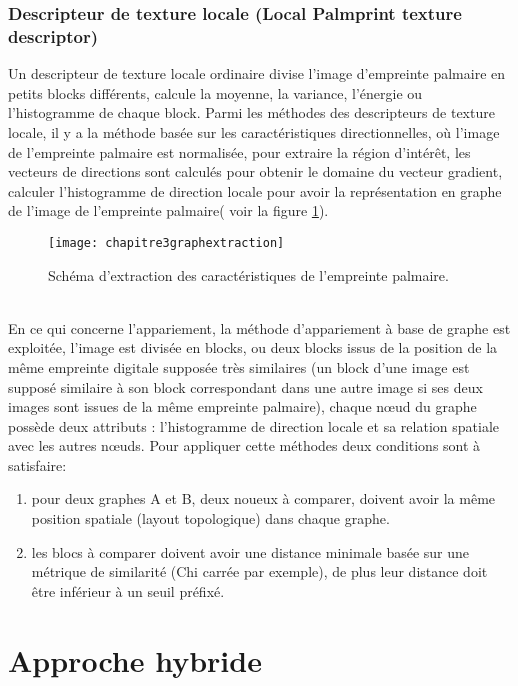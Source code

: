 {{\subsubsection{Descripteur de texture locale (Local Palmprint texture descriptor)}
Un descripteur de texture locale ordinaire divise l’image d’empreinte palmaire en petits blocks différents, calcule la moyenne, la variance, l’énergie ou l’histogramme de chaque block.
Parmi les méthodes des descripteurs de texture locale, il y a la méthode basée sur les caractéristiques directionnelles, où l’image de l’empreinte palmaire est normalisée, pour extraire la région d’intérêt, les vecteurs de directions sont calculés pour obtenir le domaine du vecteur gradient, calculer l’histogramme de direction locale pour avoir la représentation en graphe de l’image de l’empreinte palmaire( voir la figure \ref{fig:chapitre3graphextraction})\citep{han2007palmprint}.
\begin{center}
	\begin{figure}[H]
		\centering
		 \texttt{[image: chapitre3graphextraction]}
		\caption{Schéma d'extraction des caractéristiques de l'empreinte palmaire.}
		\label{fig:chapitre3graphextraction}
	\end{figure}
\end{center}

\\ 
En ce qui concerne l’appariement, la méthode d’appariement à base de graphe est exploitée, l’image est divisée en blocks, ou deux blocks issus de la position de la même empreinte digitale supposée très similaires (un block d’une image est supposé similaire à son block correspondant dans une autre image si ses deux images sont issues de la même empreinte palmaire), chaque nœud du graphe possède deux attributs : l’histogramme de direction locale et sa relation spatiale avec les autres nœuds.
Pour appliquer cette méthodes deux conditions sont à satisfaire\citep{han2007palmprint}:
\begin{enumerate}
	\item pour deux graphes A et B, deux noueux à comparer, doivent avoir la même position spatiale (layout topologique) dans chaque graphe.
	\item les blocs à comparer doivent avoir une distance minimale basée sur une métrique de similarité (Chi carrée par exemple), de plus leur distance doit être inférieur à un seuil préfixé.
\end{enumerate}
	
	\section{Approche hybride}

}}
